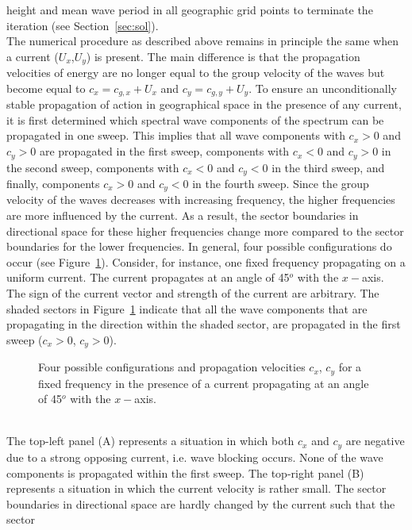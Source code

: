 \documentclass[12pt]{book}
\begin{document}
height and mean wave period in all geographic grid points to terminate the iteration (see Section~\ref{sec:sol}).
\\[2ex]
\noindent
The numerical procedure as described above remains in principle the same when a current ($U_x$,$U_y$) is present. The
main difference is that the propagation velocities of energy are no longer equal to the group velocity
of the waves but become equal to $c_x = c_{g,x}+U_x$ and $c_y = c_{g,y}+U_y$. To ensure an unconditionally
stable propagation of action in geographical space in the presence of any current, it is first determined
which spectral wave components of the spectrum can be propagated in one sweep. This implies that all wave
components with $c_x>0$ and $c_y>0$ are propagated in the first sweep, components with $c_x<0$ and $c_y>0$
in the second sweep, components with $c_x<0$ and $c_y<0$ in the third sweep, and finally, components $c_x>0$
and $c_y<0$ in the fourth sweep.
Since the group velocity of the waves decreases with increasing frequency, the higher frequencies
are more influenced by the current. As a result, the sector boundaries in directional space for these
higher frequencies change more compared to the sector boundaries for the lower frequencies. In general,
four possible configurations do occur (see Figure~\ref{fig:sweepcur}). Consider, for instance, one fixed frequency
propagating on a uniform current. The current propagates at an angle of 45$^o$ with the $x-$axis. The sign
of the current vector and strength of the current are arbitrary. The shaded sectors in Figure~\ref{fig:sweepcur}
indicate that all the wave components that are propagating in the direction within the shaded sector, are
propagated in the first sweep ($c_x>0$, $c_y>0$).
\begin{figure}[htb]
   \centerline{
              }
      \caption{Four possible configurations and propagation velocities $c_x$, $c_y$ for a fixed frequency in the presence of
               a current propagating at an angle of 45$^o$ with the $x-$axis.}
      \label{fig:sweepcur}
\end{figure}
\\[2ex]
\noindent
The top-left panel (A) represents a situation in which both $c_x$ and $c_y$ are negative due to a strong
opposing current, i.e. wave blocking occurs. None of the wave components is propagated within the first
sweep. The top-right panel (B) represents a situation in which the current velocity is rather small.
The sector boundaries in directional space are hardly changed by the current such that the sector
\end{document}
